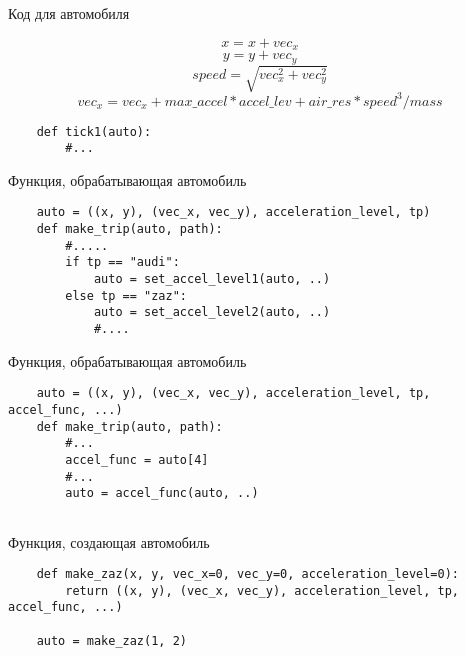 \documentclass{article}
\begin{document}
\begin{center} Код для автомобиля \end{center}
\begin{equation}
    x = x + vec_x
\end{equation}    
\begin{equation}
    y = y + vec_y
\end{equation}    
\begin{equation}
    speed = \sqrt{vec_x^2 + vec_y^2}
\end{equation}    
\begin{equation}
    vec_x = vec_x + max\_accel * accel\_lev + air\_res * speed ^{3} / mass
\end{equation}    

\begin{lstlisting}
    def tick1(auto):
        #...
\end{lstlisting}
\newpage

\begin{center} Функция, обрабатывающая автомобиль \end{center}
\begin{lstlisting}
    auto = ((x, y), (vec_x, vec_y), acceleration_level, tp)
    def make_trip(auto, path):
        #.....
        if tp == "audi":
            auto = set_accel_level1(auto, ..)
        else tp == "zaz":
            auto = set_accel_level2(auto, ..)
            #....
\end{lstlisting}
\newpage

\begin{center} Функция, обрабатывающая автомобиль \end{center}
\begin{lstlisting}
    auto = ((x, y), (vec_x, vec_y), acceleration_level, tp, accel_func, ...)
    def make_trip(auto, path):
        #...
        accel_func = auto[4]
        #...
        auto = accel_func(auto, ..)


\end{lstlisting}
\newpage

\begin{center} Функция, создающая автомобиль \end{center}
\begin{lstlisting}
    def make_zaz(x, y, vec_x=0, vec_y=0, acceleration_level=0):
        return ((x, y), (vec_x, vec_y), acceleration_level, tp, accel_func, ...)

    auto = make_zaz(1, 2)
\end{lstlisting}
\newpage
\end{document}
